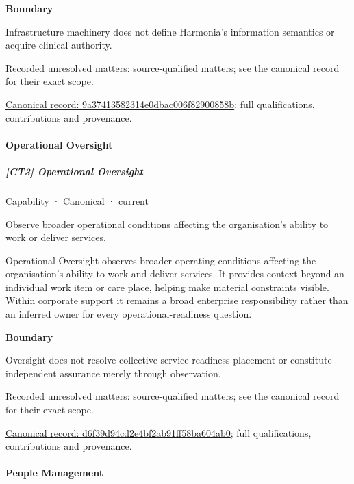 \textbf{Boundary}



Infrastructure machinery does not define Harmonia's information semantics or acquire clinical authority.


{\small Recorded unresolved matters: source-qualified matters; see the canonical record for their exact scope.}\par
{\footnotesize \href{../../../../continuum/strategy/capability/9a37413582314e0dbac006f82900858b.md}{Canonical record: 9a37413582314e0dbac006f82900858b}; full qualifications, contributions and provenance.}\par
\paragraph{Operational Oversight}

\subparagraph{[CT3] Operational Oversight}

\label{element:d6f39d94cd2e4bf2ab91ff58ba604ab0}
{\small Capability · Canonical · current}\par

Observe broader operational conditions affecting the organisation’s ability to work or deliver services.



Operational Oversight observes broader operating conditions affecting the organisation's ability to work and deliver services. It provides context beyond an individual work item or care place, helping make material constraints visible. Within corporate support it remains a broad enterprise responsibility rather than an inferred owner for every operational-readiness question.



\textbf{Boundary}



Oversight does not resolve collective service-readiness placement or constitute independent assurance merely through observation.


{\small Recorded unresolved matters: source-qualified matters; see the canonical record for their exact scope.}\par
{\footnotesize \href{../../../../continuum/strategy/capability/d6f39d94cd2e4bf2ab91ff58ba604ab0.md}{Canonical record: d6f39d94cd2e4bf2ab91ff58ba604ab0}; full qualifications, contributions and provenance.}\par
\paragraph{People Management}

